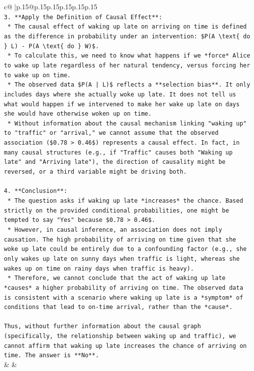 \documentclass{article}
\begin{document}
{\begin{supertabular}{c@{$\;$}|p{.15\linewidth}@{}p{.15\linewidth}p{.15\linewidth}p{.15\linewidth}p{.15\linewidth}p{.15\linewidth}}
{{{\\ 
\texttt{3.  **Apply the Definition of Causal Effect**:} \\
\texttt{    *   The causal effect of waking up late on arriving on time is defined as the difference in probability under an intervention: \$P(A \textbackslash{}text\{ do \} L) {-} P(A \textbackslash{}text\{ do \} W)\$.} \\
\texttt{    *   To calculate this, we need to know what happens if we *force* Alice to wake up late regardless of her natural tendency, versus forcing her to wake up on time.} \\
\texttt{    *   The observed data \$P(A | L)\$ reflects a **selection bias**. It only includes days where she actually woke up late. It does not tell us what would happen if we intervened to make her wake up late on days she would have otherwise woken up on time.} \\
\texttt{    *   Without information about the causal mechanism linking "waking up" to "traffic" or "arrival," we cannot assume that the observed association (\$0.78 > 0.46\$) represents a causal effect. In fact, in many causal structures (e.g., if "Traffic" causes both "Waking up late" and "Arriving late"), the direction of causality might be reversed, or a third variable might be driving both.} \\
\\ 
\texttt{4.  **Conclusion**:} \\
\texttt{    *   The question asks if waking up late *increases* the chance. Based strictly on the provided conditional probabilities, one might be tempted to say "Yes" because \$0.78 > 0.46\$.} \\
\texttt{    *   However, in causal inference, an association does not imply causation. The high probability of arriving on time given that she woke up late could be entirely due to a confounding factor (e.g., she only wakes up late on sunny days when traffic is light, whereas she wakes up on time on rainy days when traffic is heavy).} \\
\texttt{    *   Therefore, we cannot conclude that the act of waking up late *causes* a higher probability of arriving on time. The observed data is consistent with a scenario where waking up late is a *symptom* of conditions that lead to on{-}time arrival, rather than the *cause*.} \\
\\ 
\texttt{Thus, without further information about the causal graph (specifically, the relationship between waking up and traffic), we cannot affirm that waking up late increases the chance of arriving on time. The answer is **No**.} \\
            }
        }
    }
    & & \\ \\


\end{supertabular}}
\end{document}
